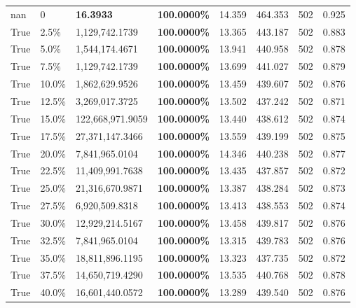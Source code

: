 \begin{table}[H]
{\begin{tabular}{lllrllll}
\midrule
nan & 0 & \bfseries 16.3933 & \bfseries 100.0000\% & 14.359 & 464.353 & 502 & 0.925 \\
\cline{1-8}
True & 2.5\% & 1,129,742.1739 & \bfseries \color{red} 100.0000\% & 13.365 & 443.187 & 502 & 0.883 \\
\cline{1-8}
True & 5.0\% & 1,544,174.4671 & \bfseries \color{red} 100.0000\% & 13.941 & 440.958 & 502 & 0.878 \\
\cline{1-8}
True & 7.5\% & 1,129,742.1739 & \bfseries \color{red} 100.0000\% & 13.699 & 441.027 & 502 & 0.879 \\
\cline{1-8}
True & 10.0\% & 1,862,629.9526 & \bfseries \color{red} 100.0000\% & 13.459 & 439.607 & 502 & 0.876 \\
\cline{1-8}
True & 12.5\% & 3,269,017.3725 & \bfseries \color{red} 100.0000\% & 13.502 & 437.242 & 502 & 0.871 \\
\cline{1-8}
True & 15.0\% & 122,668,971.9059 & \bfseries \color{red} 100.0000\% & 13.440 & 438.612 & 502 & 0.874 \\
\cline{1-8}
True & 17.5\% & 27,371,147.3466 & \bfseries \color{red} 100.0000\% & 13.559 & 439.199 & 502 & 0.875 \\
\cline{1-8}
True & 20.0\% & 7,841,965.0104 & \bfseries \color{red} 100.0000\% & 14.346 & 440.238 & 502 & 0.877 \\
\cline{1-8}
True & 22.5\% & 11,409,991.7638 & \bfseries \color{red} 100.0000\% & 13.435 & 437.857 & 502 & 0.872 \\
\cline{1-8}
True & 25.0\% & 21,316,670.9871 & \bfseries \color{red} 100.0000\% & 13.387 & 438.284 & 502 & 0.873 \\
\cline{1-8}
True & 27.5\% & 6,920,509.8318 & \bfseries \color{red} 100.0000\% & 13.413 & 438.553 & 502 & 0.874 \\
\cline{1-8}
True & 30.0\% & 12,929,214.5167 & \bfseries \color{red} 100.0000\% & 13.458 & 439.817 & 502 & 0.876 \\
\cline{1-8}
True & 32.5\% & 7,841,965.0104 & \bfseries \color{red} 100.0000\% & 13.315 & 439.783 & 502 & 0.876 \\
\cline{1-8}
True & 35.0\% & 18,811,896.1195 & \bfseries \color{red} 100.0000\% & 13.323 & 437.735 & 502 & 0.872 \\
\cline{1-8}
True & 37.5\% & 14,650,719.4290 & \bfseries \color{red} 100.0000\% & 13.535 & 440.768 & 502 & 0.878 \\
\cline{1-8}
True & 40.0\% & 16,601,440.0572 & \bfseries \color{red} 100.0000\% & 13.289 & 439.540 & 502 & 0.876 \\

\end{tabular}}
\end{table}
